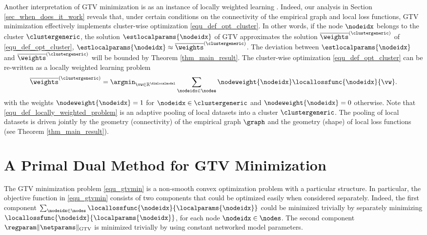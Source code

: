 \documentclass[lettersize,journal]{IEEEtran}
\begin{document}
Another interpretation of GTV minimization is as an instance of locally weighted learning \cite{LocallyWeightedLearning}. 
Indeed, our analysis in Section \ref{sec_when_does_it_work} reveals that, under certain conditions on the connectivity 
of the empirical graph and local loss functions, GTV minimization effectively implements cluster-wise optimization \eqref{equ_def_opt_cluster}. 
In other words, if the node $\nodeidx$ belongs to the cluster $\clustergeneric$, the solution $\estlocalparams{\nodeidx}$ of GTV 
approximates the solution $\overline{\weights}^{(\clustergeneric)}$ of \eqref{equ_def_opt_cluster}, 
$\estlocalparams{\nodeidx} \approx \overline{\weights}^{(\clustergeneric)}$. The deviation between $\estlocalparams{\nodeidx}$ 
and $\overline{\weights}^{(\clustergeneric)}$ will be bounded by Theorem \ref{thm_main_result}. The cluster-wise optimization \eqref{equ_def_opt_cluster} 
can be re-written as a locally weighted learning problem \cite[Sec.\ 3.1.2]{LocallyWeightedLearning}
\begin{equation} 
	\label{equ_def_locally_weighted_problem}
\overline{\weights}^{(\clustergeneric)} =  \argmin_{\vw \in \mathbb{R}^{\dimlocalmodel}} \sum_{\nodeidx \in \nodes} \nodeweight{\nodeidx} \locallossfunc{\nodeidx}{\vw}.
\vspace{-2mm}
\end{equation}
with the weights $\nodeweight{\nodeidx}=1$ for $\nodeidx \in \clustergeneric$ and $\nodeweight{\nodeidx}=0$ otherwise. 
Note that \eqref{equ_def_locally_weighted_problem} is an adaptive pooling of local datasets into a cluster $\clustergeneric$. 
The pooling of local datasets is driven jointly by the geometry (connectivity) of the empirical graph $\graph$ and the 
geometry (shape) of local loss functions (see Theorem \ref{thm_main_result}). 

\section{A Primal Dual Method for GTV Minimization}
\label{sec_federatedml}

The GTV minimization problem \eqref{equ_gtvmin} is a non-smooth convex optimization problem with a 
particular structure. In particular, the objective function in \eqref{equ_gtvmin} consists of 
two components that could be optimized easily when considered separately. Indeed, the 
first component $\sum_{\nodeidx \in \nodes} \locallossfunc{\nodeidx}{\localparams{\nodeidx}}$ 
could be minimized trivially by separately minimizing $\locallossfunc{\nodeidx}{\localparams{\nodeidx}}$, 
for each node $\nodeidx \in \nodes$. The second component $\regparam \|\netparams\|_{\rm GTV}$ 
is minimized trivially by using constant networked model parameters. 
\end{document}
